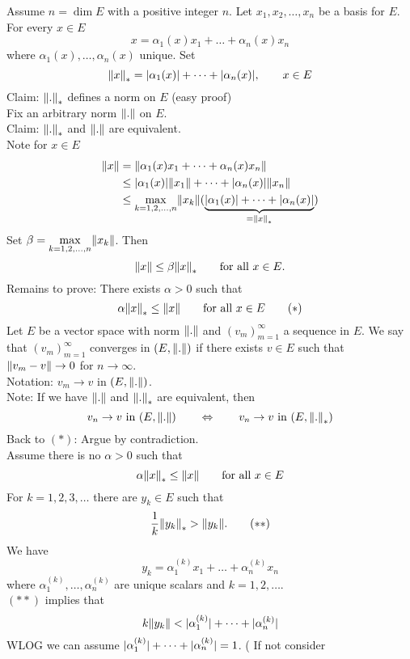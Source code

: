 \begin{beweis}
	Assume $n = \dim E$ with a positive integer $n$. Let $x_1,x_2, \dots , x_n$ be a basis for $E$. For every $x \in E$
	\[
		x = \alpha_1(x)x_1 + \dots + \alpha_n(x)x_n
	\]
	where $\alpha_1(x), \dots, \alpha_n(x)$ unique. Set 
	\[
		\norm{x}_{*} = \abs{\alpha_1(x)}+ \dots + \abs{\alpha_n(x)}, \qquad x \in E
	\]
	Claim: $\norm{.}_{*}$ defines a norm on $E$ (easy proof) \\
	Fix an arbitrary norm $\norm{.}$ on $E$. \\
	Claim: $\norm{.}_{*}$ and $\norm{.}$ are equivalent. \\
	Note for $x \in E$
	\begin{align*}
		\norm{x} &= \norm{\alpha_1(x)x_1 + \dots + \alpha_n(x)x_n}  \\
		&\leq \abs{\alpha_1(x)}\norm{x_1} + \dots + \abs{\alpha_n(x)} \norm{x_n} \\
		&\leq \max\limits_{k=1,2,\dots,n} \norm{x_k} ( \underset{= \norm{x}_{*}}{\underbrace{\abs{\alpha_1(x)}+ \dots + \abs{\alpha_n(x)}}}) 
	\end{align*}
	Set $\beta = \max\limits_{k=1,2,\dots,n} \norm{x_k}$.
	Then
	\[
		\norm{x} \leq \beta \norm{x}_{*} \qquad \text{for all }x \in E.
	\]
	Remains to prove: There exists $\alpha >0$ such that
	\[
		\alpha \norm{x}_{*} \leq \norm{x} \qquad \text{for all } x \in E \qquad (*)
	\]
	Let $E$ be a vector space with norm $\norm{.}$ and $(v_m)_{m=1}^{\infty}$ a sequence in $E$. We say that $(v_m)_{m=1}^{\infty}$ converges in $(E,\norm{.})$ if there exists $v \in E$ such that $\norm{v_m-v} \to 0$ for $n \to \infty$. \\
	Notation: $v_m \to v$ in $(E, \norm{.})$. \\
	Note: If we have $\norm{.}$ and $\norm{.}_{*}$ are equivalent, then
	\[
		v_n \to v \text{ in }(E,\norm{.}) \qquad  \Leftrightarrow \qquad v_n \to v \text{ in }(E,\norm{.}_{*})
	\] 
	Back to $(*)$: Argue by contradiction. \\
	Assume there is no $\alpha >0$ such that
	\[
		\alpha \norm{x}_{*} \leq \norm{x} \qquad \text{for all } x \in E
	\]
	For $k=1,2,3,\dots$ there are $y_k \in E$ such that
	\[
		\frac{1}{k}\norm{y_k}_{*} > \norm{y_k}. \qquad (**)
	\]
	We have 
	\[
		y_k = \alpha_1^{(k)} x_1 + \dots + \alpha_n^{(k)} x_n
	\]
	where $\alpha_1^{(k)}, \dots, \alpha_n^{(k)}$ are unique scalars and $k = 1,2, \dots$. \\
	$(**)$ implies that
	\[
		k \norm{y_k} < \abs{\alpha_1^{(k)}} + \dots + \abs{\alpha_n^{(k)}}
	\]
	WLOG we can assume $\lvert\alpha_1^{(k)}\rvert+ \dots + \lvert\alpha_n^{(k)}\rvert = 1$. ( If not consider 

\end{beweis}
